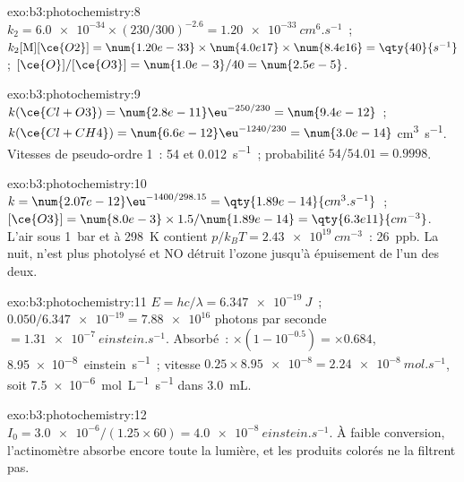 \begin{solution}{exo:b3:photochemistry:8}
$k_2 = \num{6.0e-34} \times (230/300)^{-2.6} = \qty{1.20e-33}{cm^6.s^{-1}}$~; $k_2[\mathrm M][\ce{O2}] = \num{1.20e-33} \times
\num{4.0e17} \times \num{8.4e16} = \qty{40}{s^{-1}}$; $[\ce{O}]/[\ce{O3}] = \num{1.0e-3}/40 = \num{2.5e-5}$.
\end{solution}

\begin{solution}{exo:b3:photochemistry:9}
$k(\ce{Cl + O3}) = \num{2.8e-11}\eu^{-250/230} = \num{9.4e-12}$~; $k(\ce{Cl + CH4}) = \num{6.6e-12}\eu^{-1240/230} = \num{3.0e-14}$
\unit{cm^3.s^{-1}}. Vitesses de pseudo-ordre 1~: 54 et \qty{0.012}{s^{-1}}~; probabilité $54/54.01 = 0.9998$.
\end{solution}

\begin{solution}{exo:b3:photochemistry:10}
$k = \num{2.07e-12}\eu^{-1400/298.15} = \qty{1.89e-14}{cm^3.s^{-1}}$~; $[\ce{O3}] = \num{8.0e-3} \times 1.5/\num{1.89e-14} =
\qty{6.3e11}{cm^{-3}}$. L'air sous \qty{1}{bar} et à \qty{298}{K}
contient $p/k_BT = \qty{2.43e19}{cm^{-3}}$~: \qty{26}{ppb}. La nuit,
 n'est plus photolysé et NO détruit l'ozone jusqu'à épuisement de
l'un des deux.
\end{solution}

\begin{solution}{exo:b3:photochemistry:11}
$E = hc/\lambda = \qty{6.347e-19}{J}$~; $0.050/\num{6.347e-19} = \num{7.88e16}$ photons par seconde $= \qty{1.31e-7}{einstein.s^{-1}}$.
Absorbé~: $\times(1 - 10^{-0.5}) = \times0.684$, \qty{8.95e-8}{einstein.s^{-1}}~; vitesse $0.25 \times \num{8.95e-8} =
\qty{2.24e-8}{mol.s^{-1}}$, soit \qty{7.5e-6}{mol.L^{-1}.s^{-1}} dans \qty{3.0}{mL}.
\end{solution}

\begin{solution}{exo:b3:photochemistry:12}
$I_0 = \num{3.0e-6}/(1.25 \times 60) = \qty{4.0e-8}{einstein.s^{-1}}$. À
faible conversion, l'actinomètre absorbe encore toute la lumière, et les
produits colorés ne la filtrent pas.
\end{solution}

